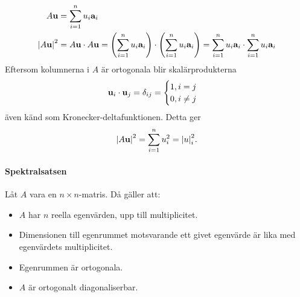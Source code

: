 \proof
\begin{align*}
	A\vect{u}         &= \sum\limits_{i = 1}^{n}u_i\vect{a}_i \\
	\abs{A\vect{u}}^2 &= A\vect{u}\cdot A\vect{u} = \left(\sum\limits_{i = 1}^{n}u_i\vect{a}_i\right)\cdot\left(\sum\limits_{i = 1}^{n}u_i\vect{a}_i\right) = \sum\limits_{i = 1}^{n}u_i\vect{a}_i\cdot\sum\limits_{i = 1}^{n}u_i\vect{a}_i
\end{align*}
Eftersom kolumnerna i $A$ är ortogonala blir skalärprodukterna
\begin{align*}
	\vect{u}_i\cdot\vect{u}_j = \delta_{ij} =
	\begin{cases}
		1, i = j \\
		0, i\neq j
	\end{cases}
\end{align*}
även känd som Kronecker-deltafunktionen. Detta ger
\begin{align*}
	\abs{A\vect{u}}^2 = \sum\limits_{i = 1}^{n}u_i^2 = \abs{u}_i^2.
\end{align*}

\paragraph{Spektralsatsen}
Låt $A$ vara en $n\times n$-matris. Då gäller att:
\begin{itemize}
	\item $A$ har $n$ reella egenvärden, upp till multiplicitet.
	\item Dimensionen till egenrummet motsvarande ett givet egenvärde är lika med egenvärdets multiplicitet.
	\item Egenrummen är ortogonala.
	\item $A$ är ortogonalt diagonaliserbar.
\end{itemize}

\proof